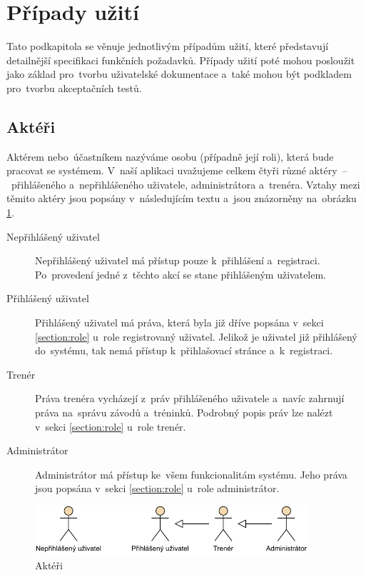 \section{Případy užití}
Tato podkapitola se věnuje jednotlivým případům užití, které představují detailnější specifikaci funkčních požadavků. Případy užití poté mohou posloužit jako základ pro~tvorbu uživatelské dokumentace a~také mohou být podkladem pro~tvorbu akceptačních testů. \cite{usecases}

\subsection{Aktéři}
Aktérem nebo~účastníkem nazýváme osobu (případně její roli), která bude pracovat se systémem. V~naší aplikaci uvažujeme celkem čtyři různé aktéry~–~přihlášeného a~nepřihlášeného uživatele, administrátora a~trenéra. Vztahy mezi těmito aktéry jsou popsány v~následujícím textu a~jsou znázorněny na~obrázku \ref{figure:actors}.
\begin{description}
	\item[Nepřihlášený uživatel]\hfill\newline
	Nepřihlášený uživatel má přístup pouze k~přihlášení a~registraci. Po~provedení jedné z~těchto akcí se stane přihlášeným uživatelem.
	\item[Přihlášený uživatel]\hfill\newline
	Přihlášený uživatel má práva, která byla již dříve popsána v~sekci \ref{section:role} u~role registrovaný uživatel. Jelikož je uživatel již přihlášený do~systému, tak nemá přístup k~přihlašovací stránce a~k~registraci.
	\item[Trenér]\hfill\newline
	Práva trenéra vycházejí z~práv přihlášeného uživatele a~navíc zahrnují práva na~správu závodů a~tréninků. Podrobný popis práv lze nalézt v~sekci \ref{section:role} u~role trenér.
	\item[Administrátor]\hfill\newline
	Administrátor má přístup ke~všem funkcionalitám systému. Jeho práva jsou popsána v~sekci \ref{section:role} u~role administrátor.
\end{description}

\begin{figure}[h]
	\caption{Aktéři}
	\label{figure:actors}
	\centering
	\includegraphics[width=0.9\textwidth]{images/actors}
\end{figure}

